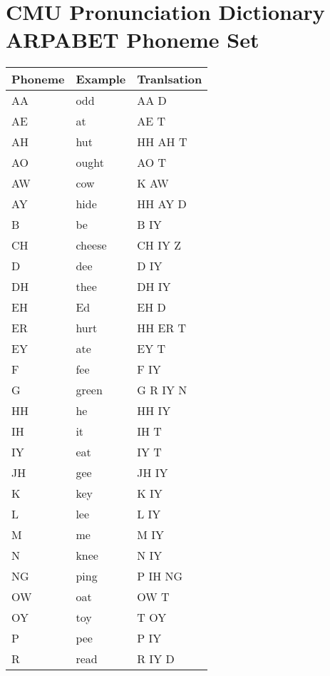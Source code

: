 \section{CMU Pronunciation Dictionary ARPABET Phoneme Set}
\label{tab:arpa}
\begin{table}[!htbp]
    \begin{tabular}{|l|l|l|}
    \hline
    Phoneme & Example & Tranlsation \\ \hline
    AA      & odd     & AA D        \\
    AE      & at      & AE T        \\
    AH      & hut     & HH AH T     \\
    AO      & ought   & AO T        \\
    AW      & cow     & K AW        \\
    AY      & hide    & HH AY D     \\
    B       & be      & B IY        \\
    CH      & cheese  & CH IY Z     \\
    D       & dee     & D IY        \\
    DH      & thee    & DH IY       \\
    EH      & Ed      & EH D        \\
    ER      & hurt    & HH ER T     \\
    EY      & ate     & EY T        \\
    F       & fee     & F IY        \\
    G       & green   & G R IY N    \\
    HH      & he      & HH IY       \\
    IH      & it      & IH T        \\
    IY      & eat     & IY T        \\
    JH      & gee     & JH IY       \\
    K       & key     & K IY        \\
    L       & lee     & L IY        \\
    M       & me      & M IY        \\
    N       & knee    & N IY        \\
    NG      & ping    & P IH NG     \\
    OW      & oat     & OW T        \\
    OY      & toy     & T OY        \\
    P       & pee     & P IY        \\
    R       & read    & R IY D      \\

\end{tabular}
\end{table}
